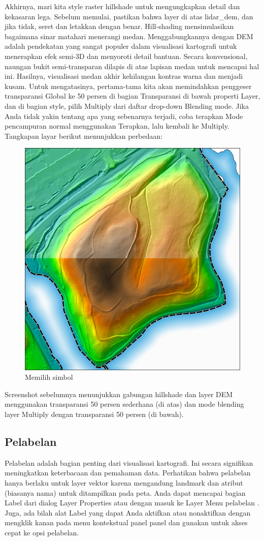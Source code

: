 \documentclass[]{book}
\begin{document}
Akhirnya, mari kita style raster hillshade untuk mengungkapkan detail dan kekasaran lega. Sebelum memulai, pastikan bahwa layer di atas lidar\_dem, dan jika tidak, seret dan letakkan dengan benar. Hill-shading mensimulasikan bagaimana sinar matahari menerangi medan. Menggabungkannya dengan DEM adalah pendekatan yang sangat populer dalam visualisasi kartografi untuk menerapkan efek semi-3D dan menyoroti detail bantuan. Secara konvensional, naungan bukit semi-transparan dilapis di atas lapisan medan untuk mencapai hal ini. Hasilnya, visualisasi medan akhir kehilangan kontras warna dan menjadi kusam. Untuk mengatasinya, pertama-tama kita akan memindahkan penggeser transparansi Global ke 50 persen di bagian Transparansi di bawah properti Layer, dan di bagian style, pilih Multiply dari daftar drop-down Blending mode. Jika Anda tidak yakin tentang apa yang sebenarnya terjadi, coba terapkan Mode pencampuran normal menggunakan Terapkan, lalu kembali ke Multiply. Tangkapan layar berikut menunjukkan perbedaan:

\begin{figure}

{\centering \includegraphics[width=0.3\linewidth]{images/09/fig913} 

}

\caption{Memilih simbol}\label{fig:fig913}
\end{figure}

Screenshot sebelumnya menunjukkan gabungan hillshade dan layer DEM menggunakan transparansi 50 persen sederhana (di atas) dan mode blending layer Multiply dengan transparansi 50 persen (di bawah).

\hypertarget{pelabelan}{%
\subsection{Pelabelan}\label{pelabelan}}

Pelabelan adalah bagian penting dari visualisasi kartografi. Ini secara signifikan meningkatkan keterbacaan dan pemahaman data. Perhatikan bahwa pelabelan hanya berlaku untuk layer vektor karena mengandung landmark dan atribut (biasanya nama) untuk ditampilkan pada peta. Anda dapat mencapai bagian Label dari dialog Layer Properties atau dengan masuk ke Layer \textbar{} Menu pelabelan . Juga, ada bilah alat Label yang dapat Anda aktifkan atau nonaktifkan dengan mengklik kanan pada menu kontekstual panel panel dan gunakan untuk akses cepat ke opsi pelabelan.
\end{document}
